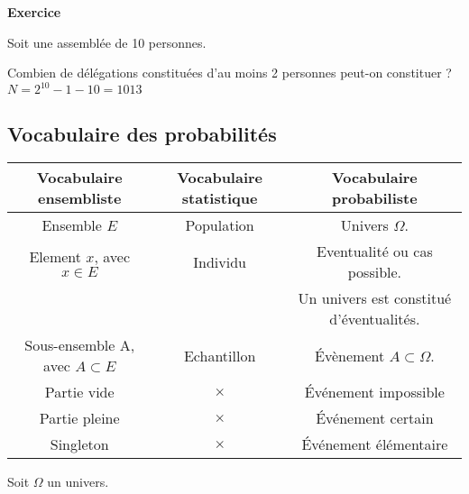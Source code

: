 \textbf{Exercice}

Soit une assemblée de 10 personnes.

Combien de délégations constituées d'au moins 2 personnes peut-on constituer ? \\

$ N = 2^{10} - 1 - 10 = 1013$ \\








\newpage 

\subsection{Vocabulaire des probabilités}

\begin{tabular}{c|c|c}
Vocabulaire ensembliste & Vocabulaire statistique & Vocabulaire probabiliste \\
\hline
Ensemble $E$ & Population & Univers $\Omega$. \\
\hline
Element $x$, avec $x\in E$ & Individu & Eventualité ou cas possible. \\
& & Un univers est constitué d'éventualités. \\
\hline
Sous-ensemble A, avec $A\subset E$ & Echantillon & Évènement $A \subset \Omega$. \\
\hline
Partie vide & \Large{$\times$} & Événement impossible \\
\hline
Partie pleine & \Large{$\times$} & Événement certain \\
\hline
Singleton & \Large{$\times$} & Événement élémentaire \\
\end{tabular}

\vspace*{.3cm}

Soit $\Omega$ un univers. 

